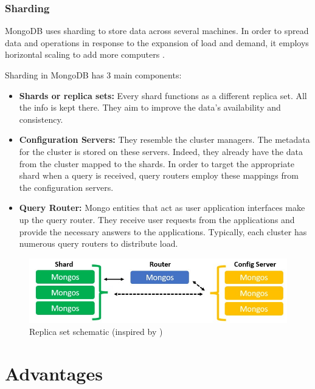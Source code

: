 \subsubsection{Sharding}

MongoDB uses sharding to store data across several machines. In order to spread data and operations in response to the expansion of load and demand, it employs horizontal scaling to add more computers \parencite{roy_databases_2020}.

Sharding in MongoDB has 3 main components:

\begin{itemize}
    \item \textbf{Shards or replica sets:} Every shard functions as a different replica set. All the info is kept there. They aim to improve the data's availability and consistency.
    \item \textbf{Configuration Servers:} They resemble the cluster managers. The metadata for the cluster is stored on these servers. Indeed, they already have the data from the cluster mapped to the shards. In order to target the appropriate shard when a query is received, query routers employ these mappings from the configuration servers.
    \item \textbf{Query Router:} Mongo entities that act as user application interfaces make up the query router. They receive user requests from the applications and provide the necessary answers to the applications. Typically, each cluster has numerous query routers to distribute load.
\end{itemize}

\begin{figure}[H]
    \centering
    \caption[Replica set schematic]{Replica set schematic (inspired by \textcite{mongodb_sharding})} \label{fig:Sharding}
    \includegraphics[width=\textwidth]{images/sharding.jpeg}
\end{figure}

\section{Advantages}

